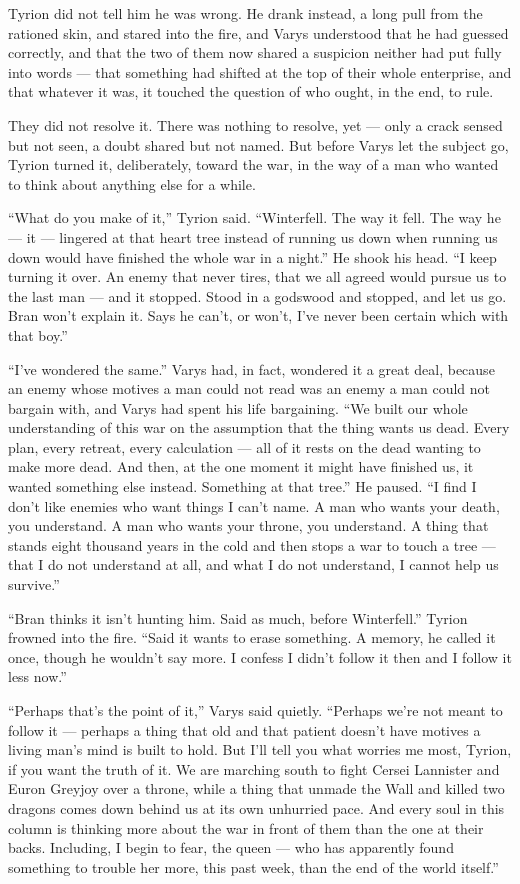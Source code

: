Tyrion did not tell him he was wrong. He drank instead, a long pull from the rationed skin, and stared into the fire, and Varys understood that he had guessed correctly, and that the two of them now shared a suspicion neither had put fully into words — that something had shifted at the top of their whole enterprise, and that whatever it was, it touched the question of who ought, in the end, to rule.

\sceneBreak

They did not resolve it. There was nothing to resolve, yet — only a crack sensed but not seen, a doubt shared but not named. But before Varys let the subject go, Tyrion turned it, deliberately, toward the war, in the way of a man who wanted to think about anything else for a while.

“What do you make of it,” Tyrion said. “Winterfell. The way it fell. The way he — it — lingered at that heart tree instead of running us down when running us down would have finished the whole war in a night.” He shook his head. “I keep turning it over. An enemy that never tires, that we all agreed would pursue us to the last man — and it stopped. Stood in a godswood and stopped, and let us go. Bran won’t explain it. Says he can’t, or won’t, I’ve never been certain which with that boy.”

“I’ve wondered the same.” Varys had, in fact, wondered it a great deal, because an enemy whose motives a man could not read was an enemy a man could not bargain with, and Varys had spent his life bargaining. “We built our whole understanding of this war on the assumption that the thing wants us dead. Every plan, every retreat, every calculation — all of it rests on the dead wanting to make more dead. And then, at the one moment it might have finished us, it wanted something else instead. Something at that tree.” He paused. “I find I don’t like enemies who want things I can’t name. A man who wants your death, you understand. A man who wants your throne, you understand. A thing that stands eight thousand years in the cold and then stops a war to touch a tree — that I do not understand at all, and what I do not understand, I cannot help us survive.”

“Bran thinks it isn’t hunting him. Said as much, before Winterfell.” Tyrion frowned into the fire. “Said it wants to erase something. A memory, he called it once, though he wouldn’t say more. I confess I didn’t follow it then and I follow it less now.”

“Perhaps that’s the point of it,” Varys said quietly. “Perhaps we’re not meant to follow it — perhaps a thing that old and that patient doesn’t have motives a living man’s mind is built to hold. But I’ll tell you what worries me most, Tyrion, if you want the truth of it. We are marching south to fight Cersei Lannister and Euron Greyjoy over a throne, while a thing that unmade the Wall and killed two dragons comes down behind us at its own unhurried pace. And every soul in this column is thinking more about the war in front of them than the one at their backs. Including, I begin to fear, the queen — who has apparently found something to trouble her more, this past week, than the end of the world itself.”

